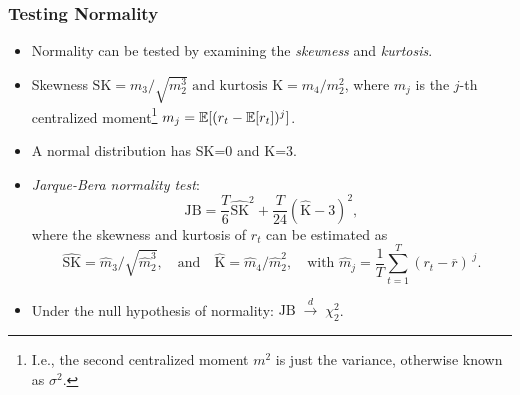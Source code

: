 \begin{frame}
\frametitle{Testing Normality}
\begin{itemize}
\item Normality can be tested
by examining the \emph{\color{red} skewness} and \emph{\color{red}kurtosis}.


\item Skewness $\text{SK}=m_{3}/\sqrt{m_{2}^{3}} \text{ and kurtosis K}=m_{4}/m_{2}^{2}$,
where $m_{j}$ is the $j$-th centralized moment\footnote{I.e., the second centralized moment $m^2$ is just the variance, otherwise known as $\sigma^2$.}
$m_{j}={\mathbb E}[(r_{t}-{\mathbb E}[r_{t}])^{j}]$.

\item A normal distribution has SK=0 and K=3.

\item\emph{\color{red}Jarque-Bera normality test}:
\[ \text{JB} = \frac{T}{6}\widehat{\text{SK}}^{2} +
   \frac{T}{24}(\widehat{\text{K}}-3)^{2}, \]
where the skewness and kurtosis of $r_{t}$ can be estimated as
\[
  \widehat{\text{SK}} =
  \hat{m}_{3} / \sqrt{\hat{m}_{2}^{3}}, \quad \text{and} \quad
  \widehat{\text{K}} = \hat{m}_{4} / \hat{m}_{2}^{2}, \quad \text{with } \hat{m}_{j} = \frac{1}{T} \sum_{t=1}^{T}
(r_{t}-\overline{r})^{\;j}.
 \]
\item Under the null hypothesis of normality:  $\mathrm{JB}\;{\overset{d}{\longrightarrow }}\;
\chi_{2}^{2}$.
\end{itemize}
\end{frame}
